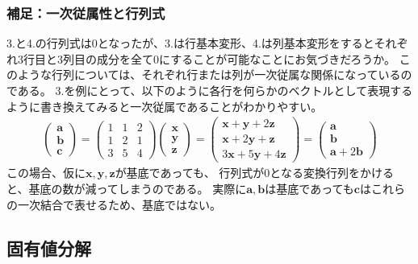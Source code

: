 \documentclass[10pt]{ujarticle}
\begin{document}
\subsubsection{補足：一次従属性と行列式}
3.と4.の行列式は0となったが、3.は行基本変形、4.は列基本変形をするとそれぞれ3行目と3列目の成分を全て0にすることが可能なことにお気づきだろうか。
このような行列については、それぞれ行または列が一次従属な関係になっているのである。
3.を例にとって、以下のように各行を何らかのベクトルとして表現するように書き換えてみると一次従属であることがわかりやすい。
$$
\begin{aligned}
  \begin{pmatrix}
    \mathbf{a}\\\mathbf{b}\\\mathbf{c}
  \end{pmatrix}=\begin{pmatrix}
    1 & 1 & 2\\
    1 & 2 & 1\\
    3 & 5 & 4
  \end{pmatrix}\begin{pmatrix}
    \mathbf{x}\\\mathbf{y}\\\mathbf{z}
  \end{pmatrix}=\begin{pmatrix}
      \mathbf{x}+\mathbf{y}+2\mathbf{z}\\
      \mathbf{x}+2\mathbf{y}+\mathbf{z}\\
      3\mathbf{x}+5\mathbf{y}+4\mathbf{z}
    \end{pmatrix}=\begin{pmatrix}
      \mathbf{a}\\\mathbf{b}\\\mathbf{a}+2\mathbf{b}
    \end{pmatrix}
\end{aligned}
$$
この場合、仮に$\mathbf{x},\mathbf{y},\mathbf{z}$が基底であっても、
行列式が0となる変換行列をかけると、基底の数が減ってしまうのである。
実際に$\mathbf{a},\mathbf{b}$は基底であっても$\mathbf{c}$はこれらの一次結合で表せるため、基底ではない。

\hypertarget{q2}{\subsection{固有値分解}}
\end{document}

